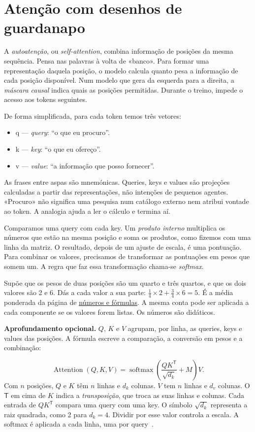 \section{Atenção com desenhos de guardanapo}

A \emph{autoatenção}, ou \emph{self-attention}, combina informação de posições da mesma sequência. Pensa nas palavras à volta de «banco». Para formar uma representação daquela posição, o modelo calcula quanto pesa a informação de cada posição disponível. Num modelo que gera da esquerda para a direita, a \emph{máscara causal} indica quais as posições permitidas. Durante o treino, impede o acesso aos tokens seguintes.

De forma simplificada, para cada token temos três vetores:

\begin{itemize}[leftmargin=*]
\item q — \emph{query}: “o que eu procuro”.
\item k — \emph{key}: “o que eu ofereço”.
\item v — \emph{value}: “a informação que posso fornecer”.
\end{itemize}

As frases entre aspas são mnemónicas. Queries, keys e values são projeções calculadas a partir das representações, não intenções de pequenos agentes. «Procuro» não significa uma pesquisa num catálogo externo nem atribui vontade ao token. A analogia ajuda a ler o cálculo e termina aí.

Comparamos uma query com cada key. Um \emph{produto interno} multiplica os números que estão na mesma posição e soma os produtos, como fizemos com uma linha da matriz. O resultado, depois de um ajuste de escala, é uma pontuação. Para combinar os valores, precisamos de transformar as pontuações em pesos que somem um. A regra que faz essa transformação chama-se \emph{softmax}.

Supõe que os pesos de duas posições são um quarto e três quartos, e que os dois valores são 2 e 6. Dás a cada valor a sua parte: $\tfrac14\times2+\tfrac34\times6=5$. É a média ponderada da página de \hyperref[sec:ler-numeros]{números e fórmulas}. A mesma conta pode ser aplicada a cada componente se os valores forem listas. Os números são didáticos.

\textbf{Aprofundamento opcional.} $Q$, $K$ e $V$ agrupam, por linha, as queries, keys e values das posições. A fórmula escreve a comparação, a conversão em pesos e a combinação:

\[
\operatorname{Attention}(Q,K,V)=
\operatorname{softmax}\!\left(\frac{QK^{\mathsf T}}{\sqrt{d_k}}+M\right)V.
\]
Com $n$ posições, $Q$ e $K$ têm $n$ linhas e $d_k$ colunas. $V$ tem $n$ linhas e $d_v$ colunas. O $\mathsf T$ em cima de $K$ indica a \emph{transposição}, que troca as suas linhas e colunas. Cada entrada de $QK^{\mathsf T}$ compara uma query com uma key. O símbolo $\sqrt{d_k}$ representa a raiz quadrada, como 2 para $d_k=4$. Dividir por esse valor controla a escala. A softmax é aplicada a cada linha, uma por query~\citep{vaswani2017}.

